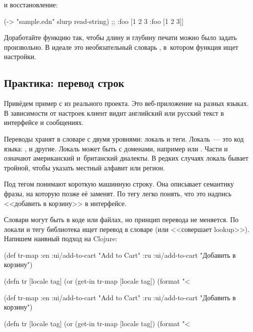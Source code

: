\fi

\noindent
и восстановление:

\begin{clojure}
(-> "sample.edn" slurp read-string)
;; {:foo [1 2 3 {:foo [1 2 3]}]}
\end{clojure}


Доработайте функцию так, чтобы длину и глубину печати можно было задать
произвольно. В идеале это необязательный словарь , в~котором функция
ищет настройки.

\subsection{Практика: перевод строк}

\label{translate}

Привёдем пример с  из реального проекта. Это веб-приложение на
разных языках. В зависимости от настроек клиент видит английский или русский
текст в интерфейсе и сообщениях.


Переводы хранят в словаре с двумя уровнями: локаль и теги. Локаль~--- это код
языка: ,  и другие. Локаль может быть с доменами, например
 или . Части  и  означают
американский и~британский диалекты. В редких случаях локаль бывает тройной,
чтобы указать местный алфавит или регион.

Под тегом понимают короткую машинную строку. Она описывает семантику фразы, на
которую позже её заменят. По тегу  легко понять, что это
надпись <<добавить в корзину>> в интерфейсе.

Словари могут быть в коде или файлах, но принцип перевода не меняется. По локали
и тегу библиотека ищет перевод в словаре (или <<совершает lookup>>). Напишем
наивный подход на Clojure:

\ifnarrow

\begin{clojure}
(def tr-map
  {:en {:ui/add-to-cart "Add to Cart"}
   :ru {:ui/add-to-cart
        "Добавить в корзину"}})

(defn tr [locale tag]
  (or (get-in tr-map [locale tag])
      (format "<%
\end{clojure}

\else

\begin{clojure}
(def tr-map
  {:en {:ui/add-to-cart "Add to Cart"}
   :ru {:ui/add-to-cart "Добавить в корзину"}})

(defn tr [locale tag]
  (or (get-in tr-map [locale tag])
      (format "<%
\end{clojure}

